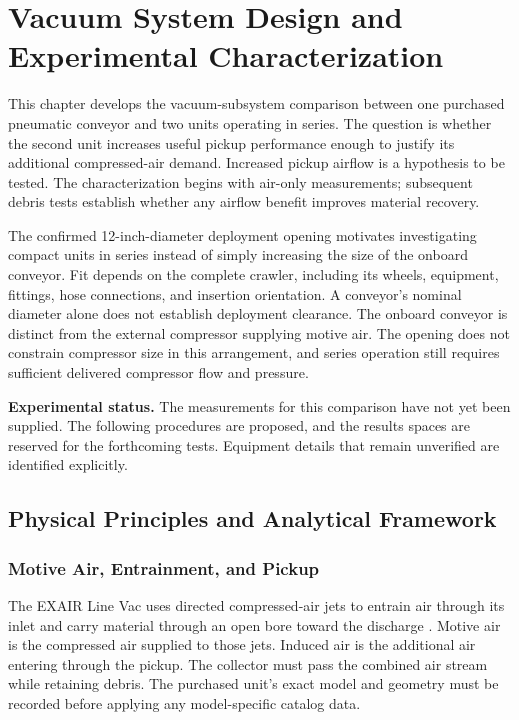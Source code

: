 \chapter{Vacuum System Design and Experimental Characterization}
\label{chap:vacuum}
\label{chap:design}
\begingroup
{}

This chapter develops the vacuum-subsystem comparison between one purchased pneumatic conveyor and two units operating in series. The question is whether the second unit increases useful pickup performance enough to justify its additional compressed-air demand. Increased pickup airflow is a hypothesis to be tested. The characterization begins with air-only measurements; subsequent debris tests establish whether any airflow benefit improves material recovery.

The confirmed 12-inch-diameter deployment opening motivates investigating compact units in series instead of simply increasing the size of the onboard conveyor. Fit depends on the complete crawler, including its wheels, equipment, fittings, hose connections, and insertion orientation. A conveyor's nominal diameter alone does not establish deployment clearance. The onboard conveyor is distinct from the external compressor supplying motive air. The opening does not constrain compressor size in this arrangement, and series operation still requires sufficient delivered compressor flow and pressure.

\textbf{Experimental status.} The measurements for this comparison have not yet been supplied. The following procedures are proposed, and the results spaces are reserved for the forthcoming tests. Equipment details that remain unverified are identified explicitly.

\section{Physical Principles and Analytical Framework}
\label{sec:vacuum-principles}

\subsection{Motive Air, Entrainment, and Pickup}
The EXAIR Line Vac uses directed compressed-air jets to entrain air through its inlet and carry material through an open bore toward the discharge \citep{exairLineVacCatalog}. Motive air is the compressed air supplied to those jets. Induced air is the additional air entering through the pickup. The collector must pass the combined air stream while retaining debris. The purchased unit's exact model and geometry must be recorded before applying any model-specific catalog data.

